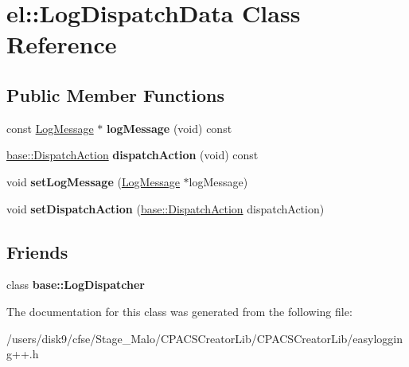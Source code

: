 \hypertarget{classel_1_1LogDispatchData}{\section{el\-:\-:Log\-Dispatch\-Data Class Reference}
\label{classel_1_1LogDispatchData}
}
\subsection*{Public Member Functions}
\begin{DoxyCompactItemize}
\item 
\hypertarget{classel_1_1LogDispatchData_ad52d4ddc330b6260bf10e9879a653829}{const \hyperlink{classel_1_1LogMessage}{Log\-Message} $\ast$ {\bfseries log\-Message} (void) const }\label{classel_1_1LogDispatchData_ad52d4ddc330b6260bf10e9879a653829}

\item 
\hypertarget{classel_1_1LogDispatchData_aee0808c660aa39b34ee69850a2c74c09}{\hyperlink{namespaceel_1_1base_a3aa2563d38e47388ba242a1694fc2839}{base\-::\-Dispatch\-Action} {\bfseries dispatch\-Action} (void) const }\label{classel_1_1LogDispatchData_aee0808c660aa39b34ee69850a2c74c09}

\item 
\hypertarget{classel_1_1LogDispatchData_a09fcf704874e1f0a9d9061fafdaa0ce8}{void {\bfseries set\-Log\-Message} (\hyperlink{classel_1_1LogMessage}{Log\-Message} $\ast$log\-Message)}\label{classel_1_1LogDispatchData_a09fcf704874e1f0a9d9061fafdaa0ce8}

\item 
\hypertarget{classel_1_1LogDispatchData_ae85d1d70f93b81ec57f058cf4bda27d4}{void {\bfseries set\-Dispatch\-Action} (\hyperlink{namespaceel_1_1base_a3aa2563d38e47388ba242a1694fc2839}{base\-::\-Dispatch\-Action} dispatch\-Action)}\label{classel_1_1LogDispatchData_ae85d1d70f93b81ec57f058cf4bda27d4}

\end{DoxyCompactItemize}
\subsection*{Friends}
\begin{DoxyCompactItemize}
\item 
\hypertarget{classel_1_1LogDispatchData_a84d22f9ad5b796e49ff5f15a8c32773d}{class {\bfseries base\-::\-Log\-Dispatcher}}\label{classel_1_1LogDispatchData_a84d22f9ad5b796e49ff5f15a8c32773d}

\end{DoxyCompactItemize}


The documentation for this class was generated from the following file\-:\begin{DoxyCompactItemize}
\item 
/users/disk9/cfse/\-Stage\-\_\-\-Malo/\-C\-P\-A\-C\-S\-Creator\-Lib/\-C\-P\-A\-C\-S\-Creator\-Lib/easylogging++.\-h\end{DoxyCompactItemize}
